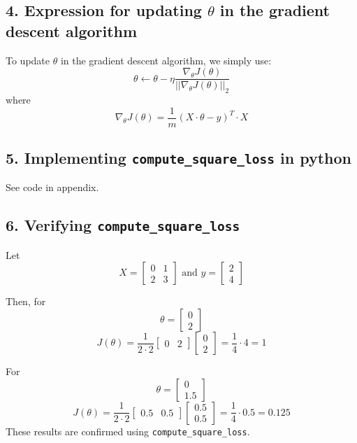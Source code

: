 \documentclass[paper=a4, fontsize=11pt]{scrartcl} %
\numberwithin{equation}{section} %
\numberwithin{figure}{section} %
\numberwithin{table}{section} %
\begin{document}
\subsection*{4. Expression for updating $\theta$ in the gradient descent algorithm}

To update $\theta$ in the gradient descent algorithm, we simply use:
\[
\theta \leftarrow \theta - \eta \frac{\nabla_{\theta} J(\theta)}{||\nabla_{\theta} J(\theta)||_2}
\]
where
\[ \nabla_{\theta} J(\theta) =\frac{1}{m} (X\cdot \theta - y)^T \cdot X\]

\subsection*{5. Implementing \texttt{compute\_square\_loss} in python}

See code in appendix.

\subsection*{6. Verifying \texttt{compute\_square\_loss}}

Let
\[ X =
	\begin{bmatrix}
		0 & 1 \\
		2 & 3 
	\end{bmatrix}
\textrm{ and }
y =
	\begin{bmatrix}
		2 \\
		4
	\end{bmatrix}
\]

Then, for 
\[
\theta =
	\begin{bmatrix}
		0 \\
		2
	\end{bmatrix}
\]
\[
J(\theta) = \frac{1}{2\cdot2}
\begin{bmatrix}
	0 & 2
\end{bmatrix}
\begin{bmatrix}
0\\
2
\end{bmatrix}
= \frac{1}{4} \cdot 4 = 1
\]

For 
\[\theta =
	\begin{bmatrix}
		0 \\
		1.5
	\end{bmatrix}
\]
\[
J(\theta) = \frac{1}{2\cdot2}
\begin{bmatrix}
	0.5 & 0.5
\end{bmatrix}
\begin{bmatrix}
0.5\\
0.5
\end{bmatrix}
= \frac{1}{4} \cdot 0.5 = 0.125
\]
These results are confirmed using \texttt{compute\_square\_loss}.
\end{document}
